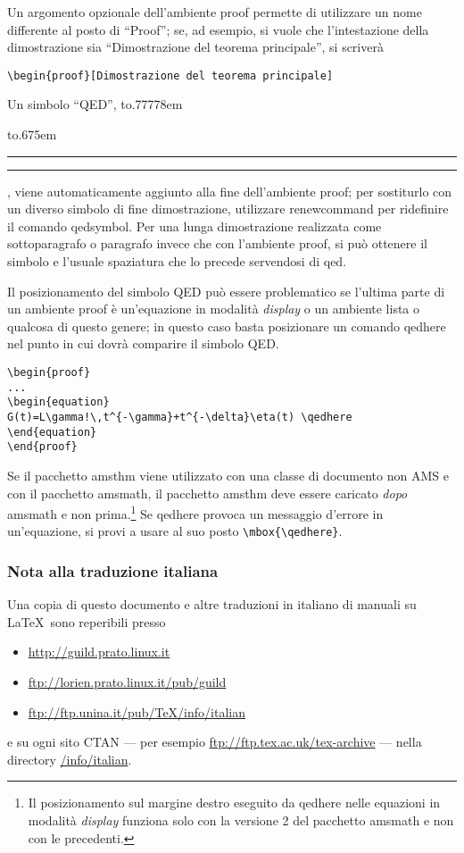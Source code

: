 \documentclass[a4paper]{article}
\providecommand{\qq}[1]{\textquotedblleft#1\textquotedblright}
\newcommand{\ntt}{%
  \fontfamily\ttdefault \fontseries\mddefault \fontshape\updefault
  \selectfont
}
\DeclareRobustCommand{\cn}[1]{{\ntt\bslchar#1}}
\DeclareRobustCommand{\pkg}[1]{{\ntt#1}}
\DeclareRobustCommand{\env}[1]{{\ntt#1}}
\providecommand{\qedsymbol}{\leavevmode
  \hbox to.77778em{%
  \hfil\vrule
  \vbox to.675em{\hrule width.6em\vfil\hrule}%
  \vrule\hfil}}
\begin{document}
Un argomento opzionale dell'ambiente \env{proof} permette di utilizzare un
nome differente al posto di \qq{Proof}; se, ad esempio, si vuole che
l'intestazione della dimostrazione sia \qq{Dimostrazione del teorema
principale}, si scriver\`a
\begin{verbatim}
\begin{proof}[Dimostrazione del teorema principale]
\end{verbatim}

Un simbolo \qq{QED}, \qedsymbol, viene automaticamente aggiunto alla
fine dell'ambiente \env{proof}; per sostiturlo con un diverso simbolo di
fine dimostrazione, utilizzare \cn{renewcom\-mand} per ridefinire il comando \cn{qedsymbol}.
Per una lunga dimostrazione realizzata come sottoparagrafo o paragrafo
invece che con l'ambiente
\env{proof}, si pu\`o ottenere il simbolo e l'usuale spaziatura che lo
precede servendosi di \cn{qed}.

Il posizionamento del simbolo QED pu\`o essere problematico se l'ultima
parte di un ambiente \env{proof} \`e un'equazione in modalit\`a
\emph{display} o un ambiente lista o qualcosa di questo genere; in questo caso basta
posizionare un comando \cn{qedhere} nel punto in cui dovr\`a comparire
il simbolo QED.
\begin{verbatim}
\begin{proof}
...
\begin{equation}
G(t)=L\gamma!\,t^{-\gamma}+t^{-\delta}\eta(t) \qedhere
\end{equation}
\end{proof}
\end{verbatim}
Se il pacchetto \pkg{amsthm} viene utilizzato con una classe di documento non
AMS e con il pacchetto \pkg{amsmath}, il pacchetto \pkg{amsthm} deve
essere caricato
\emph{dopo} \pkg{amsmath} e non prima.\footnote{Il posizionamento sul
margine destro eseguito da \cn{qedhere} nelle equazioni in modalit\`a
\emph{display} funziona solo con la versione 2 del pacchetto
\pkg{amsmath} e non con le precedenti.}
Se \cn{qedhere} provoca un messaggio d'errore in un'equazione, si provi
a usare al suo posto \verb'\mbox{\qedhere}'.

\subsubsection*{Nota alla traduzione italiana}
Una copia di questo documento e altre traduzioni in italiano di
manuali su \LaTeX\ sono reperibili presso
\begin{itemize}
\item\url{http://guild.prato.linux.it}
\item\url{ftp://lorien.prato.linux.it/pub/guild}
\item\url{ftp://ftp.unina.it/pub/TeX/info/italian}
\end{itemize}
e su ogni sito CTAN --- per esempio \url{ftp://ftp.tex.ac.uk/tex-archive} --- nella
directory \url{/info/italian}.
\end{document}
